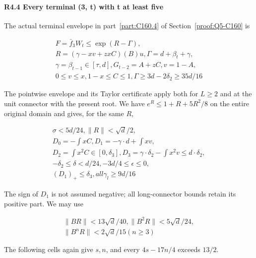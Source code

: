 \paragraph{R4.4 Every terminal (3, t) with t at least five}

The actual terminal envelope in part~\ref{part:C160.4} of
Section~\ref{proof:Q5-C160} is

\[
\begin{gathered}
F=\bar f_3W_t\le \exp(R-\Gamma),\\
R=(\gamma-xv+zxC)(B)u,\Gamma=d+\beta_t+\gamma,\\
\gamma=\beta_{t-1}\in[\tau,d],G_{t-2}=A+zC,v=1-A,\\
0\le v\le x,1-x\le C\le 1,\Gamma\ge 3d-2\delta_2\ge 35d/16
\end{gathered}
\]

The pointwise envelope and its Taylor certificate apply both for \(L\ge2\) and at the unit connector with the present root. We have \(e^R\le1+R+5R^2/8\) on the entire original domain and gives, for the same \(R\),

\[
\begin{gathered}
\sigma<5d/24,\|R\|<\sqrt{d}/2,\\
D_0=-\int xC,D_1=-\gamma\cdot d+\int xv,\\
D_2=\int x^2C\in[0,\delta_3],D_3=\gamma\cdot \delta_2-\int x^2v\le d\cdot \delta_2,\\
-\delta_2\le \delta<d/24,-3d/4\le \epsilon\le 0,\\
(D_1)_+\le \delta_3,all \gamma_l\ge 9d/16 
\end{gathered}\tag{R4.4.1}
\]

The sign of \(D_1\) is not assumed negative; all long-connector bounds retain its positive part. We may use

\[
\begin{gathered}
\|BR\|<13\sqrt{d}/40,\|B^2R\|<5\sqrt{d}/24,\\
\|B^nR\|<2\sqrt{d}/15 (n\ge 3) 
\end{gathered}\tag{R4.4.2}
\]

The following cells again give \(s,\allowbreak \allowbreak  n\), and every \(4s-17n/4\) exceeds \(13/2\).


